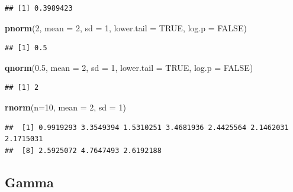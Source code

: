 \documentclass[
]{book}
\newenvironment{Shaded}{\begin{snugshade}}{\end{snugshade}}
\newcommand{\AttributeTok}[1]{\textcolor[rgb]{0.13,0.29,0.53}{#1}}
\newcommand{\ConstantTok}[1]{\textcolor[rgb]{0.56,0.35,0.01}{#1}}
\newcommand{\DecValTok}[1]{\textcolor[rgb]{0.00,0.00,0.81}{#1}}
\newcommand{\FloatTok}[1]{\textcolor[rgb]{0.00,0.00,0.81}{#1}}
\newcommand{\FunctionTok}[1]{\textcolor[rgb]{0.13,0.29,0.53}{\textbf{#1}}}
\newcommand{\NormalTok}[1]{#1}
\begin{document}
\begin{verbatim}
## [1] 0.3989423
\end{verbatim}

\begin{Shaded}
\begin{Highlighting}[]
\FunctionTok{pnorm}\NormalTok{(}\DecValTok{2}\NormalTok{, }\AttributeTok{mean =} \DecValTok{2}\NormalTok{, }\AttributeTok{sd =} \DecValTok{1}\NormalTok{, }\AttributeTok{lower.tail =} \ConstantTok{TRUE}\NormalTok{, }\AttributeTok{log.p =} \ConstantTok{FALSE}\NormalTok{)}
\end{Highlighting}
\end{Shaded}

\begin{verbatim}
## [1] 0.5
\end{verbatim}

\begin{Shaded}
\begin{Highlighting}[]
\FunctionTok{qnorm}\NormalTok{(}\FloatTok{0.5}\NormalTok{, }\AttributeTok{mean =} \DecValTok{2}\NormalTok{, }\AttributeTok{sd =} \DecValTok{1}\NormalTok{, }\AttributeTok{lower.tail =} \ConstantTok{TRUE}\NormalTok{, }\AttributeTok{log.p =} \ConstantTok{FALSE}\NormalTok{)}
\end{Highlighting}
\end{Shaded}

\begin{verbatim}
## [1] 2
\end{verbatim}

\begin{Shaded}
\begin{Highlighting}[]
\FunctionTok{rnorm}\NormalTok{(}\AttributeTok{n=}\DecValTok{10}\NormalTok{, }\AttributeTok{mean =} \DecValTok{2}\NormalTok{, }\AttributeTok{sd =} \DecValTok{1}\NormalTok{)}
\end{Highlighting}
\end{Shaded}

\begin{verbatim}
##  [1] 0.9919293 3.3549394 1.5310251 3.4681936 2.4425564 2.1462031 2.1715031
##  [8] 2.5925072 4.7647493 2.6192188
\end{verbatim}

\hypertarget{gamma}{%
\subsection{Gamma}\label{gamma}}
\end{document}
